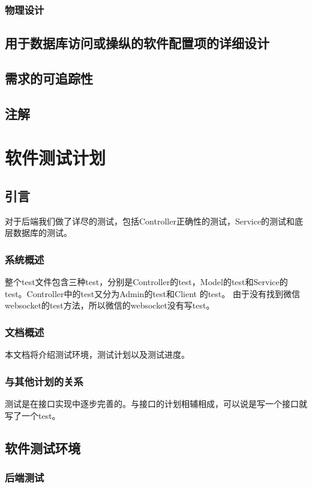 \documentclass{article}
\begin{document}
\subsubsection{物理设计}

\subsection{用于数据库访问或操纵的软件配置项的详细设计}

\subsection{需求的可追踪性}

\subsection{注解}

\section{软件测试计划}
\label{软件测试计划}
\subsection{引言}
对于后端我们做了详尽的测试，包括Controller正确性的测试，Service的测试和底层数据库的测试。
\subsubsection{系统概述}
整个test文件包含三种test，分别是Controller的test，Model的test和Service的test。Controller中的test又分为Admin的test和Client 的test。 由于没有找到微信websocket的test方法，所以微信的websocket没有写test。
\subsubsection{文档概述}
本文档将介绍测试环境，测试计划以及测试进度。
\subsubsection{与其他计划的关系}
测试是在接口实现中逐步完善的。与接口的计划相辅相成，可以说是写一个接口就写了一个test。
\subsection{软件测试环境}
\subsubsection{后端测试}
\end{document}
